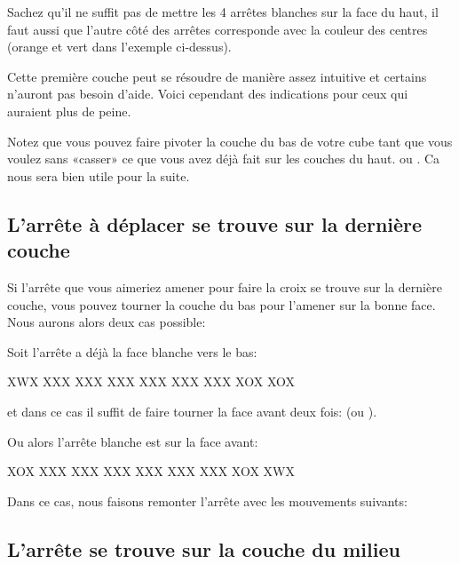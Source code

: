 \documentclass[10pt,paper=a5,pagesize]{scrbook}
\begin{document}
Sachez qu'il ne suffit pas de mettre les 4 arrêtes blanches sur la face du haut, il faut aussi
que l'autre côté des arrêtes corresponde avec la couleur des centres (orange et vert dans l'exemple ci-dessus).

Cette première couche peut se résoudre de manière assez intuitive et certains n'auront pas besoin
d'aide. Voici cependant des indications pour ceux qui auraient plus de peine.

Notez que vous pouvez faire pivoter la couche du bas de votre cube tant que vous voulez sans «casser» ce que vous avez déjà fait sur les couches du haut.  ou . Ca nous sera bien utile pour la suite.

\subsection{L'arrête à déplacer se trouve sur la dernière couche}
\label{subsec:c1d}

Si l'arrête que vous aimeriez amener pour faire la croix se trouve sur la dernière couche, vous pouvez tourner la couche du bas pour l'amener sur la bonne face. Nous aurons alors deux cas possible:

Soit l'arrête a déjà la face blanche vers le bas:

\begin{center}
	\RubikFaceDown%
	{X}{W}{X}%
	{X}{X}{X}%
	{X}{X}{X}
	\RubikFaceRight%
	{X}{X}{X}%
	{X}{X}{X}%
	{X}{X}{X}
	\RubikFaceFront%
	{X}{X}{X}%
	{X}{O}{X}%
	{X}{O}{X}
\end{center}

et dans ce cas il suffit de faire tourner la face avant deux fois:  (ou ).

Ou alors l'arrête blanche est sur la face avant:

\begin{center}
	\RubikFaceDown%
	{X}{O}{X}%
	{X}{X}{X}%
	{X}{X}{X}
	\RubikFaceRight%
	{X}{X}{X}%
	{X}{X}{X}%
	{X}{X}{X}
	\RubikFaceFront%
	{X}{X}{X}%
	{X}{O}{X}%
	{X}{W}{X}
\end{center}

Dans ce cas, nous faisons remonter l'arrête avec les mouvements suivants: 


\subsection{L'arrête se trouve sur la couche du milieu}
\end{document}
